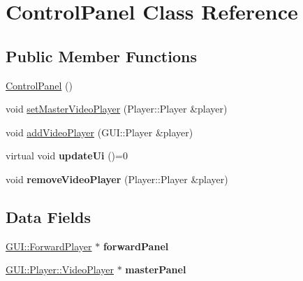 \hypertarget{classGUI_1_1Player_1_1ControlPanel}{}\section{Control\+Panel Class Reference}
\label{classGUI_1_1Player_1_1ControlPanel}
\subsection*{Public Member Functions}
\begin{DoxyCompactItemize}
\item 
\hyperlink{classGUI_1_1Player_1_1ControlPanel_a0efa607fe77b973e1128eae3bb33a9a1}{Control\+Panel} ()
\item 
void \hyperlink{classGUI_1_1Player_1_1ControlPanel_a798f5ffd7fe32e3fe8f67feed1e555c4}{set\+Master\+Video\+Player} (Player\+::\+Player \&player)
\item 
void \hyperlink{classGUI_1_1Player_1_1ControlPanel_a1a372b46dee9c1f2b2696337231b3add}{add\+Video\+Player} (G\+U\+I\+::\+Player \&player)
\item 
\hypertarget{classGUI_1_1Player_1_1ControlPanel_aa9963358cf9cff5ea2531d73efa78f73}{}virtual void {\bfseries update\+Ui} ()=0\label{classGUI_1_1Player_1_1ControlPanel_aa9963358cf9cff5ea2531d73efa78f73}

\item 
\hypertarget{classGUI_1_1Player_1_1ControlPanel_aa24579c43e90697b0b05662270dfca3f}{}void {\bfseries remove\+Video\+Player} (Player\+::\+Player \&player)\label{classGUI_1_1Player_1_1ControlPanel_aa24579c43e90697b0b05662270dfca3f}

\end{DoxyCompactItemize}
\subsection*{Data Fields}
\begin{DoxyCompactItemize}
\item 
\hypertarget{classGUI_1_1Player_1_1ControlPanel_a15dc5e66f941f96f5b10d4da627f7f4e}{}\hyperlink{classGUI_1_1ForwardPlayer}{G\+U\+I\+::\+Forward\+Player} $\ast$ {\bfseries forward\+Panel}\label{classGUI_1_1Player_1_1ControlPanel_a15dc5e66f941f96f5b10d4da627f7f4e}

\item 
\hypertarget{classGUI_1_1Player_1_1ControlPanel_a87e40dd85b4d49e1618debba5269e676}{}\hyperlink{classGUI_1_1Player_1_1VideoPlayer}{G\+U\+I\+::\+Player\+::\+Video\+Player} $\ast$ {\bfseries master\+Panel}\label{classGUI_1_1Player_1_1ControlPanel_a87e40dd85b4d49e1618debba5269e676}

\end{DoxyCompactItemize}
